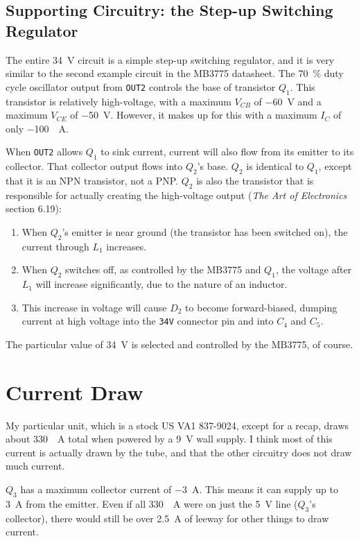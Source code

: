 \documentclass{article}
\newcommand{\chippin}{\texttt}
\begin{document}
\subsection{Supporting Circuitry: the Step-up Switching Regulator}
The entire \qty{34}{\volt} circuit is a simple step-up switching
regulator, and it is very similar to the second example circuit in the
MB3775 datasheet. The \qty{70}{\%} duty cycle oscillator output from
\chippin{OUT2} controls the base of transistor $Q_1$. This transistor
is relatively high-voltage, with a maximum $V_{CB}$ of
\qty{-60}{\volt} and a maximum $V_{CE}$ of \qty{-50}{\volt}. However,
it makes up for this with a maximum $I_C$ of only
\qty{-100}{\milli{}A}.

When \chippin{OUT2} allows $Q_1$ to sink current, current will also
flow from its emitter to its collector. That collector output flows
into $Q_2$'s base. $Q_2$ is identical to $Q_1$, except that it is an
NPN transistor, not a PNP. $Q_2$ is also the transistor that is
responsible for actually creating the high-voltage output (\textit{The
Art of Electronics} section 6.19):

\begin{enumerate}
\item When $Q_2$'s emitter is near ground (the transistor has been
  switched on), the current through $L_1$ increases. 
\item When $Q_2$ switches off, as controlled by the MB3775 and $Q_1$,
  the voltage after $L_1$ will increase significantly, due to the
  nature of an inductor.
\item This increase in voltage will cause $D_2$ to become
  forward-biased, dumping current at high voltage into the
  \chippin{34V} connector pin and into $C_4$ and $C_5$.
\end{enumerate}

The particular value of \qty{34}{\volt} is selected and controlled by
the MB3775, of course.

\section{Current Draw}
My particular unit, which is a stock US VA1 837-9024, except for a
recap, draws about \qty{330}{\milli{}A} total when powered by a
\qty{9}{\volt} wall supply. I think most of this current is actually
drawn by the tube, and that the other circuitry does not draw much
current.

$Q_3$ has a maximum collector current of \qty{-3}{A}. This means it
can supply up to \qty{3}{A} from the emitter. Even if all
\qty{330}{\milli{}A} were on just the \qty{5}{\volt} line ($Q_3$'s
collector), there would still be over \qty{2.5}{A} of leeway for other
things to draw current.
\end{document}
